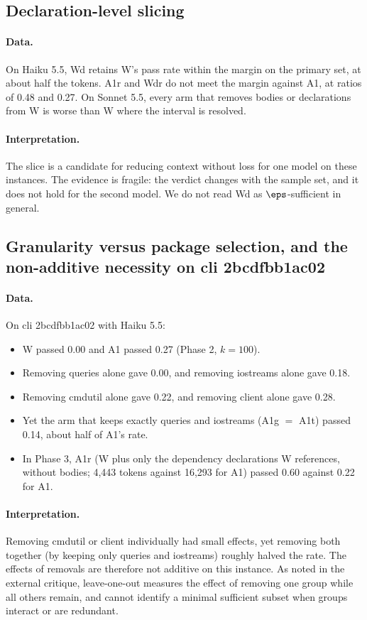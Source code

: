 \subsection{Declaration-level slicing}

\paragraph{Data.} On Haiku 5.5, Wd retains W's pass rate within the margin on the primary set, at about half the tokens. A1r and Wdr do not meet the margin against A1, at ratios of 0.48 and 0.27. On Sonnet 5.5, every arm that removes bodies or declarations from W is worse than W where the interval is resolved.

\paragraph{Interpretation.} The slice is a candidate for reducing context without loss for one model on these instances. The evidence is fragile: the verdict changes with the sample set, and it does not hold for the second model. We do not read Wd as $\eps$-sufficient in general.

\subsection{Granularity versus package selection, and the non-additive necessity on cli 2bcdfbb1ac02}

\paragraph{Data.} On cli 2bcdfbb1ac02 with Haiku 5.5:
\begin{itemize}
\item W passed 0.00 and A1 passed 0.27 (Phase 2, $k=100$).
\item Removing queries alone gave 0.00, and removing iostreams alone gave 0.18.
\item Removing cmdutil alone gave 0.22, and removing client alone gave 0.28.
\item Yet the arm that keeps exactly queries and iostreams (A1g $=$ A1t) passed 0.14, about half of A1's rate.
\item In Phase 3, A1r (W plus only the dependency declarations W references, without bodies; 4,443 tokens against 16,293 for A1) passed 0.60 against 0.22 for A1.
\end{itemize}

\paragraph{Interpretation.} Removing cmdutil or client individually had small effects, yet removing both together (by keeping only queries and iostreams) roughly halved the rate. The effects of removals are therefore not additive on this instance. As noted in the external critique, leave-one-out measures the effect of removing one group while all others remain, and cannot identify a minimal sufficient subset when groups interact or are redundant.

